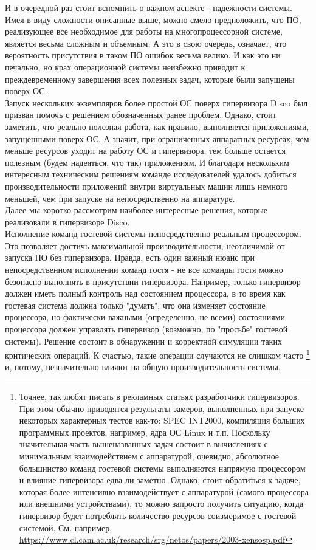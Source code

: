 \documentclass[14pt, a4paper]{article}
\begin{document}
И в очередной раз стоит вспомнить о важном аспекте - надежности системы. Имея в
виду сложности описанные выше, можно смело предположить, что ПО, реализующее
все необходимое для работы на многопроцессорной системе, является весьма
сложным и объемным. А это в свою очередь, означает, что вероятность присутствия в
таком ПО ошибок весьма велико. И как это ни печально, но крах операционной
системы неизбежно приводит к преждевременному завершения всех полезных задач,
которые были запущены поверх ОС.\\

Запуск нескольких экземпляров более простой ОС поверх гипервизора Disco был
призван помочь с решением обозначенных ранее проблем. Однако, стоит заметить,
что реально полезная работа, как правило, выполняется приложениями, запущенными
поверх ОС. А значит, при ограниченных аппаратных ресурсах, чем меньше ресурсов
уходит на работу ОС и гипервизора, тем больше остается полезным (будем надеяться,
что так) приложениям. И благодаря нескольким интересным техническим решениям
команде исследователей удалось добиться производительности приложений внутри
виртуальных машин лишь немного меньшей, чем при запуске на непосредственно на
аппаратуре.\\

Далее мы коротко рассмотрим наиболее интересные решения, которые реализовали в
гипервизоре Disco.\\

Исполнение команд гостевой системы непосредственно реальным процессором. Это
позволяет достичь максимальной производительности, неотличимой от запуска ПО без
гипервизора. Правда, есть один важный нюанс при непосредственном исполнении
команд гостя - не все команды гостя можно безопасно выполнять в присутствии
гипервизора. Например, только гипервизор должен иметь полный контроль над
состоянием процессора, в то время как гостевая система должна только "думать", что
она изменяет состояние процессора, но фактически важными (определенно, не всеми)
состояниями процессора должен управлять гипервизор (возможно, по "просьбе"
гостевой системы). Решение состоит в обнаружении и корректной симуляции 
таких критических операций. К счастью, такие операции случаются не слишком часто \footnote{Точнее, так любят писать в рекламных статьях разработчики гипервизоров. При этом обычно
приводятся результаты замеров, выполненных при запуске некоторых характерных тестов
как-то: SPEC INT2000, компиляция больших программных проектов, например, ядра ОС Linux и
т.п. Поскольку значительная часть вышеназванных задач состоит в вычислениях с
минимальным взаимодействием с аппаратурой, очевидно, абсолютное большинство команд
гостевой системы выполняются напрямую процессором и влияние гипервизора едва ли
заметно. Однако, стоит обратиться к задаче, которая более интенсивно взаимодействует с
аппаратурой (самого процессора или внешними устройствами), то можно запросто получить
ситуацию, когда гипервизор будет потреблять количество ресурсов соизмеримое с гостевой
системой. См. например, \href{https://www.cl.cam.ac.uk/research/srg/netos/papers/2003-xensosp.pdf}{https://www.cl.cam.ac.uk/research/srg/netos/papers/2003-xensosp.pdf}} 
и, потому, незначительно влияют на общую производительность системы.\\
\end{document}
